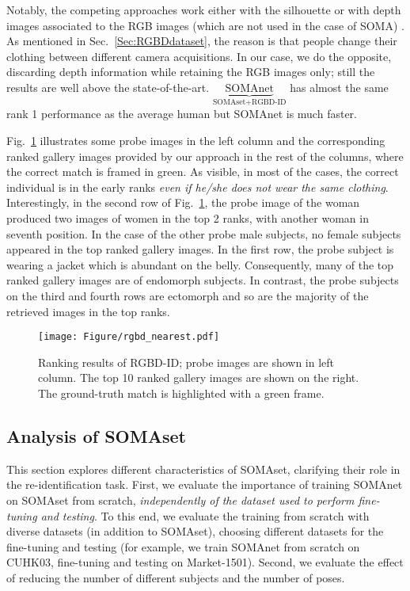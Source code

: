 \documentclass[10pt,journal,letterpaper,compsoc]{IEEEtran}
\newcommand{\ts}[2]{$\underbrace{\text{#1}}_\text{#2}$}
\begin{document}
Notably, the competing approaches work either with the silhouette \cite{PDM}
or with depth images associated to the RGB images (which are not used in the case of SOMA) \cite{barbosa2012re}. As mentioned in Sec.~\ref{Sec:RGBDdataset}, the reason is that people change their clothing between different camera acquisitions. In our case, we do the opposite, discarding depth information while retaining the RGB images only; still the results are well above the state-of-the-art. \ts{SOMAnet}{SOMAset+RGBD-ID} has almost the same rank 1 performance as the average human but SOMAnet is much faster.

Fig.~\ref{fig:RGBdidqualitative} illustrates some probe images in the left column and the corresponding ranked gallery images provided by our approach in the rest of the columns, where the correct match is framed in green. As visible, in most of the cases, the correct individual is in the early ranks \emph{even if he/she does not wear the same clothing}. Interestingly, in the second row of Fig.~\ref{fig:RGBdidqualitative}, the probe image of the woman produced two images of women in the top 2 ranks, with another woman in seventh position. In the case of the other probe male subjects, no female subjects appeared in the top ranked gallery images. In the first row, the probe subject is wearing a jacket which is abundant on the belly. Consequently, many of the top ranked gallery images are of endomorph subjects. In contrast, the probe subjects on the third and fourth rows are ectomorph and so are the majority of the retrieved images in the top ranks. 



\begin{figure}[ht]
  \centering
  \texttt{[image: Figure/rgbd\_nearest.pdf]}
  \caption{Ranking results of RGBD-ID; probe images are shown in left column. The top 10 ranked gallery images are shown on the right. The ground-truth match is highlighted with a green frame.}
  \label{fig:RGBdidqualitative}
\end{figure}


\subsection{Analysis of SOMAset}\label{sec:SOMAset}
This section explores different characteristics of SOMAset, clarifying their role in the re-identification task.
First, we evaluate the importance of training SOMAnet on SOMAset from scratch, \emph{independently of the dataset used to perform fine-tuning and testing}.
To this end, we evaluate the training from scratch with diverse datasets (in addition to SOMAset), choosing different datasets for the fine-tuning  and testing (for example, we train SOMAnet from scratch on CUHK03, fine-tuning and testing on Market-1501).
Second, we evaluate the effect of reducing the number of different subjects and the number of poses.
\end{document}
